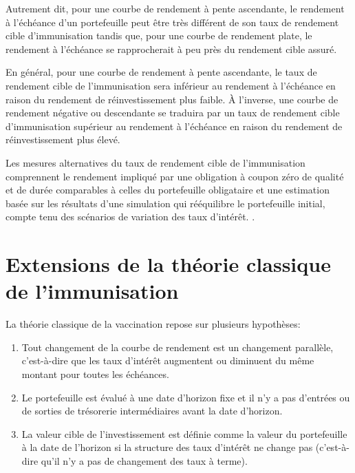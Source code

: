 \documentclass[12pt]{article}
\begin{document}
\vspace{0.5cm}

Autrement dit, pour une courbe de rendement à pente ascendante, le rendement à l'échéance d'un portefeuille peut être très différent de son taux de rendement cible d'immunisation tandis que, pour une courbe de rendement plate, le rendement à l'échéance se rapprocherait à peu près du rendement cible assuré.

\vspace{0.5cm}

En général, pour une courbe de rendement à pente ascendante, le taux de rendement cible de l'immunisation sera inférieur au rendement à l'échéance en raison du rendement de réinvestissement plus faible. À l'inverse, une courbe de rendement négative ou descendante se traduira par un taux de rendement cible d'immunisation supérieur au rendement à l'échéance en raison du rendement de réinvestissement plus élevé.

\vspace{0.5cm}

Les mesures alternatives du taux de rendement cible de l'immunisation comprennent le rendement impliqué par une obligation à coupon zéro de qualité et de durée comparables à celles du portefeuille obligataire et une estimation basée sur les résultats d'une simulation qui rééquilibre le portefeuille initial, compte tenu des scénarios de variation des taux d'intérêt. .

\section{Extensions de la théorie classique de l'immunisation}
La théorie classique de la vaccination repose sur plusieurs hypothèses:
\begin{enumerate}
\item Tout changement de la courbe de rendement est un changement parallèle, c'est-à-dire que les taux d'intérêt augmentent ou diminuent du même montant pour toutes les échéances.
\item Le portefeuille est évalué à une date d'horizon fixe et il n'y a pas d'entrées ou de sorties de trésorerie intermédiaires avant la date d'horizon.
\item La valeur cible de l'investissement est définie comme la valeur du portefeuille à la date de l'horizon si la structure des taux d'intérêt ne change pas (c'est-à-dire qu'il n'y a pas de changement des taux à terme).
\end{enumerate}
\end{document}

